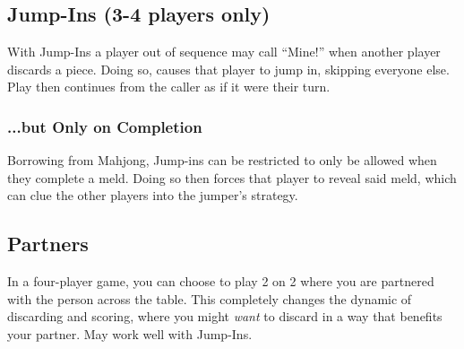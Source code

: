 \subsection{Jump-Ins (3-4 players only)}
With Jump-Ins a player out of sequence may call ``Mine!'' when another player discards a piece. Doing so, causes that player to jump in, skipping everyone else.
Play then continues from the caller as if it were their turn.

\subsubsection{...but Only on Completion}
Borrowing from Mahjong, Jump-ins can be restricted to only be allowed when they complete a meld. Doing so then forces that player to reveal said meld, which can clue the other players into the jumper's strategy.

\subsection{Partners}
In a four-player game, you can choose to play 2 on 2 where you are partnered with the person across the table.
This completely changes the dynamic of discarding and scoring, where you might \textit{want} to discard in a way that benefits your partner. May work well with Jump-Ins.